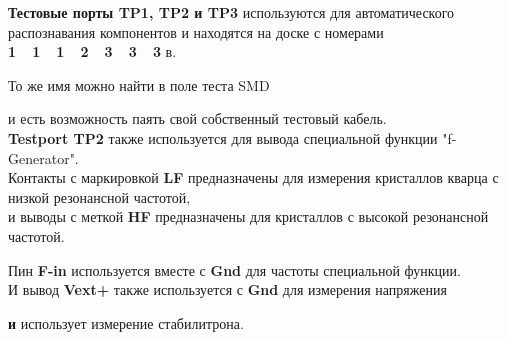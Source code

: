 \textbf{ Тестовые порты TP1, TP2 и TP3}  используются для автоматического распознавания компонентов
и находятся на доске с номерами \textbf{1~~1~~1~~2~~3~~3~~3} в.

То же имя можно найти в поле теста SMD

и есть возможность паять свой собственный тестовый кабель.\\

\textbf{ Testport TP2} также используется для вывода специальной функции "f-Generator". \\
Контакты с маркировкой \textbf{ LF} предназначены для измерения кристаллов кварца с низкой резонансной частотой,
\\ и выводы с меткой \textbf{ HF} предназначены для кристаллов с высокой резонансной частотой.

Пин \textbf{ F-in} используется вместе с \textbf{ Gnd} для частоты специальной функции. \\
И вывод \textbf{ Vext+} также используется с \textbf{ Gnd} для измерения напряжения

\textbf{ и}  использует измерение стабилитрона.
